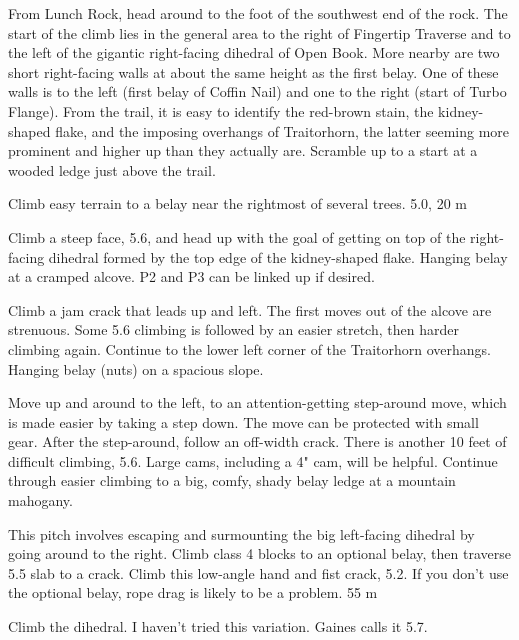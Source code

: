 \documentclass{tahquitz}
\begin{document}
From Lunch Rock, head around to the foot of the southwest end of the
rock.  The start of the climb lies in the general area to the right of
Fingertip Traverse and to the left of the gigantic right-facing
dihedral of Open Book.  More nearby are two short right-facing walls
at about the same height as the first belay.  One of these walls is to
the left (first belay of Coffin Nail) and one to the right (start of
Turbo Flange).  From the trail, it is easy to identify the red-brown
stain, the kidney-shaped flake, and the imposing overhangs of
Traitorhorn, the latter seeming more prominent and higher up than they
actually are.  Scramble up to a start at a wooded ledge just above
the trail. 

\somespace

 Climb easy terrain to a belay near the rightmost of several trees. 5.0, 20 m

 Climb a steep face, 5.6, and
head up with the goal of getting on top of the right-facing
dihedral formed by the top edge of the kidney-shaped flake. Hanging belay at a
cramped alcove. P2 and P3 can be linked up if desired.

 Climb a jam crack that leads up and left. The first moves
out of the alcove are strenuous. Some 5.6 climbing is followed by an
easier stretch, then harder climbing again.  Continue to the lower
left corner of the Traitorhorn overhangs. Hanging belay (nuts) on a spacious
slope.

 Move up and around to the left, to an attention-getting step-around move,
which is made easier by taking a step down. The move can be protected with small
gear. After the step-around, follow an off-width crack.
There is another 10 feet of difficult climbing, 5.6. Large cams, including a 4" cam,
will be helpful. 
Continue through easier climbing to a big, comfy, shady belay ledge at a mountain mahogany.

 This pitch involves escaping and surmounting the big left-facing dihedral by
going around to the right. Climb class 4 blocks to an optional belay, then 
traverse 5.5 slab to a crack.
Climb this low-angle hand and fist crack, 5.2.
If you don't use the optional belay, rope drag is likely to be a problem. 55 m

 Climb the dihedral. I haven't tried this variation. Gaines calls it 5.7.

\somespace

\upfriction

\end{document}

